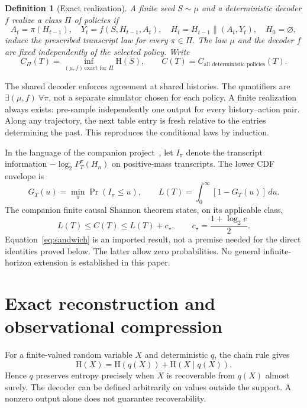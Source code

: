 \documentclass[11pt]{article}
\newtheorem{definition}[theorem]{Definition}
\theoremstyle{remark}\newtheorem{remark}[theorem]{Remark}
\newcommand{\HH}{\mathrm H}
\newcommand{\cstar}{c_\star}
\begin{document}
\begin{definition}[Exact realization]
A finite seed $S\sim\mu$ and a deterministic decoder $f$ realize a class
$\Pi$ of policies if
\[
 A_t=\pi(H_{t-1}),\quad Y_t=f(S,H_{t-1},A_t),\quad
 H_t=H_{t-1}\mathbin{\|}(A_t,Y_t),\quad H_0=\varnothing,
\]
induce the prescribed transcript law for every $\pi\in\Pi$.
The law $\mu$ and the decoder $f$ are fixed independently of the selected policy.
Write
\[
 C_\Pi(T)=\inf_{(\mu,f)\,\text{exact for }\Pi}\HH(S),
 \qquad C(T)=C_{\text{all deterministic policies}}(T).
\]
\end{definition}
The shared decoder enforces agreement at shared histories. The quantifiers are
$\exists(\mu,f)\ \forall\pi$, not a separate simulator chosen for each policy.
A finite realization always exists: pre-sample independently one output for every
history--action pair. Along any trajectory, the next table entry is fresh
relative to the entries determining the past. This reproduces the conditional
laws by induction.

In the language of the companion project~\cite{repo}, let $I_\pi$ denote
the transcript information $-\log_2P_T^\pi(H_n)$ on positive-mass transcripts.
The lower CDF envelope is
\[
 G_T(u)=\min_\pi\Pr(I_\pi\le u),\qquad
 L(T)=\int_0^\infty[1-G_T(u)]\,du.
\]
The companion finite causal Shannon theorem states, on its applicable class,
\begin{equation}\label{eq:sandwich}
 L(T)\le C(T)\le L(T)+\cstar,
 \qquad \cstar=\frac{1+\log_2e}{2}.
\end{equation}
Equation~\eqref{eq:sandwich} is an imported result, not a premise needed for
the direct identities proved below. The latter allow zero probabilities.
No general infinite-horizon extension is established in this paper.

\section{Exact reconstruction and observational compression}
For a finite-valued random variable $X$ and deterministic $q$, the chain rule gives
\begin{equation}\label{eq:loss}
 \HH(X)=\HH(q(X))+\HH(X\mid q(X)).
\end{equation}
Hence $q$ preserves entropy precisely when $X$ is recoverable from $q(X)$ almost
surely. The decoder can be defined arbitrarily on values outside the support.
A nonzero output alone does not guarantee recoverability.
\end{document}
